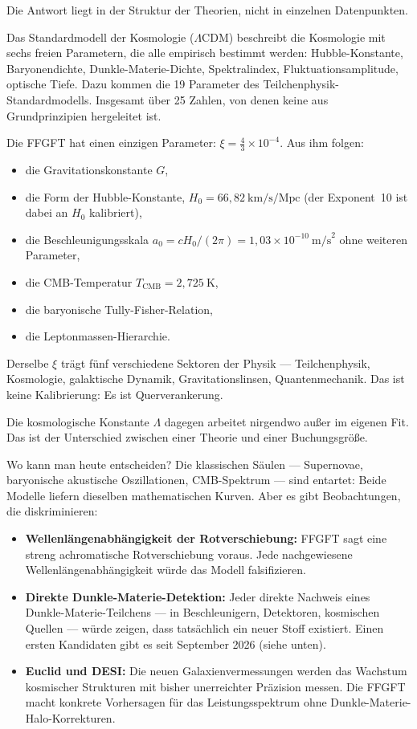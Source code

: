 \documentclass[11pt,oneside]{book}
\begin{document}
Die Antwort liegt in der Struktur der Theorien, nicht in
einzelnen Datenpunkten.

Das Standardmodell der Kosmologie ($\Lambda$CDM) beschreibt
die Kosmologie mit sechs freien Parametern, die alle empirisch
bestimmt werden: Hubble-Konstante, Baryonendichte, Dunkle-Materie-Dichte,
Spektralindex, Fluktuationsamplitude, optische Tiefe. Dazu
kommen die 19 Parameter des Teilchenphysik-Standardmodells.
Insgesamt über 25 Zahlen, von denen keine aus Grundprinzipien
hergeleitet ist.

Die FFGFT hat einen einzigen Parameter: $\xi = \tfrac{4}{3}
\times 10^{-4}$. Aus ihm folgen:
\begin{itemize}
  \item die Gravitationskonstante $G$,
  \item die Form der Hubble-Konstante, $H_0 = 66{,}82~\text{km/s/Mpc}$
    (der Exponent~10 ist dabei an $H_0$ kalibriert),
  \item die Beschleunigungsskala $a_0 = cH_0/(2\pi) = 1{,}03 \times 10^{-10}~\text{m/s}^2$
    ohne weiteren Parameter,
  \item die CMB-Temperatur $T_\text{CMB} = 2{,}725~\text{K}$,
  \item die baryonische Tully-Fisher-Relation,
  \item die Leptonmassen-Hierarchie.
\end{itemize}

Derselbe $\xi$ trägt fünf verschiedene Sektoren der Physik —
Teilchenphysik, Kosmologie, galaktische Dynamik, Gravitationslinsen,
Quantenmechanik. Das ist keine Kalibrierung: Es ist
Querverankerung.

Die kosmologische Konstante $\Lambda$ dagegen arbeitet nirgendwo
außer im eigenen Fit. Das ist der Unterschied zwischen einer
Theorie und einer Buchungsgröße.

\medskip

Wo kann man heute entscheiden? Die klassischen Säulen —
Supernovae, baryonische akustische Oszillationen, CMB-Spektrum
— sind entartet: Beide Modelle liefern dieselben
mathematischen Kurven. Aber es gibt Beobachtungen, die diskriminieren:

\begin{itemize}
  \item \textbf{Wellenlängenabhängigkeit der Rotverschiebung:}
    FFGFT sagt eine streng achromatische Rotverschiebung voraus.
    Jede nachgewiesene Wellenlängenabhängigkeit würde das Modell
    falsifizieren.
  \item \textbf{Direkte Dunkle-Materie-Detektion:}
    Jeder direkte Nachweis eines Dunkle-Materie-Teilchens —
    in Beschleunigern, Detektoren, kosmischen Quellen — würde
    zeigen, dass tatsächlich ein neuer Stoff existiert. Einen
    ersten Kandidaten gibt es seit September 2026 (siehe unten).
  \item \textbf{Euclid und DESI:}
    Die neuen Galaxienvermessungen werden das Wachstum
    kosmischer Strukturen mit bisher unerreichter Präzision
    messen. Die FFGFT macht konkrete Vorhersagen für das
    Leistungsspektrum ohne Dunkle-Materie-Halo-Korrekturen.
\end{itemize}
\end{document}
